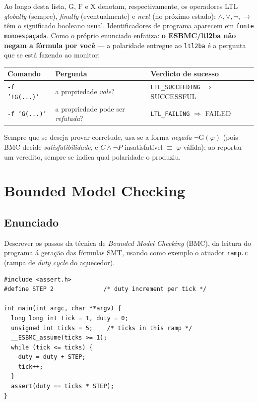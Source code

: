\documentclass[12pt,a4paper]{article}
\newcommand{\vv}[1]{\texttt{#1}}
\begin{document}
Ao longo desta lista, $\mathrm{G}$, $\mathrm{F}$ e $\mathrm{X}$ denotam, respectivamente,
os operadores LTL \emph{globally} (sempre), \emph{finally} (eventualmente) e \emph{next}
(no pr\'oximo estado); $\wedge,\vee,\neg,\rightarrow$ t\^em o significado booleano usual.
Identificadores de programa aparecem em \vv{fonte monoespa\c{c}ada}. Como o pr\'oprio
enunciado enfatiza: \textbf{o ESBMC/ltl2ba n\~ao negam a f\'ormula por voc\^e} --- a
polaridade entregue ao \texttt{ltl2ba} \'e a pergunta que se est\'a fazendo ao monitor:

\begin{center}
\begin{tabular}{@{}lll@{}}
\toprule
Comando & Pergunta & Verdicto de sucesso \\
\midrule
\texttt{-f '!G(...)'} & a propriedade \emph{vale}? & \texttt{LTL\_SUCCEEDING} $\Rightarrow$ SUCCESSFUL \\
\texttt{-f 'G(...)'}  & a propriedade pode ser \emph{refutada}? & \texttt{LTL\_FAILING} $\Rightarrow$ FAILED \\
\bottomrule
\end{tabular}
\end{center}

Sempre que se deseja provar corretude, usa-se a forma \emph{negada} $\neg\mathrm{G}(\varphi)$
(pois BMC decide \emph{satisfatibilidade}, e $C\wedge\neg P$ insatisfat\'ivel $\equiv$
$\varphi$ v\'alida); ao reportar um veredito, sempre se indica qual polaridade o produziu.

\newpage

\section{Bounded Model Checking}

\subsection*{Enunciado}
Descrever os passos da t\'ecnica de \emph{Bounded Model Checking} (BMC), da leitura do
programa \'a gera\c{c}\~ao das f\'ormulas SMT, usando como exemplo o atuador \vv{ramp.c}
(rampa de \emph{duty cycle} do aquecedor).

\begin{lstlisting}[style=cstyle,caption={exercises/ecps/ramp.c}]
#include <assert.h>
#define STEP 2              /* duty increment per tick */

int main(int argc, char **argv) {
  long long int tick = 1, duty = 0;
  unsigned int ticks = 5;    /* ticks in this ramp */
  __ESBMC_assume(ticks >= 1);
  while (tick <= ticks) {
    duty = duty + STEP;
    tick++;
  }
  assert(duty == ticks * STEP);
}
\end{lstlisting}
\end{document}
